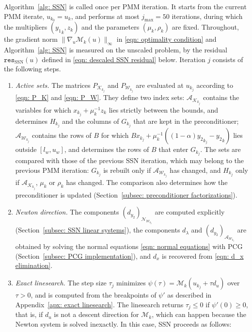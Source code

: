 Algorithm~\ref{alg: SSN} is called once per PMM iteration. It starts from the current PMM iterate, $u_{k_0} = u_k$, and performs at most $j_{\max} = 50$ iterations, during which the multipliers $({y_1}_k,z_k)$ and the parameters $(\mu_k,\rho_k)$ are fixed. Throughout, the gradient norm $\|\nabla_u \mathcal{M}_k(u)\|_\infty$ in \eqref{eqn: optimality condition} and Algorithm~\ref{alg: SSN} is measured on the unscaled problem, by the residual $\texttt{res}_{\mathrm{SSN}}(u)$ defined in \eqref{eqn: descaled SSN residual} below. Iteration $j$ consists of the following steps.
\begin{enumerate}
    \item \emph{Active sets.} The matrices $P_{\mathcal{K}_{k_j}}$ and $P_{\mathcal{W}_{k_j}}$ are evaluated at $u_{k_j}$ according to \eqref{eqn: P_K} and \eqref{eqn: P_W}. They define two index sets: $\mathcal{A}_{\mathcal{K}_{k_j}}$ contains the variables for which $x_{k_j} + \mu_k^{-1} z_k$ lies strictly between the bounds, and determines $H_{k_j}$ and the columns of $G_{k_j}$ that are kept in the preconditioner; $\mathcal{A}_{\mathcal{W}_{k_j}}$ contains the rows of $B$ for which $Bx_{k_j} + \mu_k^{-1}((1-\alpha){y_2}_{k_j} - {y_2}_k)$ lies outside $[l_w,u_w]$, and determines the rows of $B$ that enter $G_{k_j}$. The sets are compared with those of the previous SSN iteration, which may belong to the previous PMM iteration: $G_{k_j}$ is rebuilt only if $\mathcal{A}_{\mathcal{W}_{k_j}}$ has changed, and $H_{k_j}$ only if $\mathcal{A}_{\mathcal{K}_{k_j}}$, $\mu_k$ or $\rho_k$ has changed. The comparison also determines how the preconditioner is updated (Section~\ref{subsec: preconditioner factorizations}).
    \item \emph{Newton direction.} The components $(d_{y_2})_{\mathcal{N}_{\mathcal{W}_{k_j}}}$ are computed explicitly (Section~\ref{subsec: SSN linear systems}), the components $d_\lambda$ and $(d_{y_2})_{\mathcal{A}_{\mathcal{W}_{k_j}}}$ are obtained by solving the normal equations \eqref{eqn: normal equations} with PCG (Section~\ref{subsec: PCG implementation}), and $d_x$ is recovered from \eqref{eqn: d_x elimination}.
    \item \emph{Exact linesearch.} The step size $\tau_j$ minimizes $\psi(\tau) = \mathcal{M}_k(u_{k_j} + \tau d_u)$ over $\tau > 0$, and is computed from the breakpoints of $\psi'$ as described in Appendix~\ref{apx: exact linesearch}. The linesearch returns $\tau_j \le 0$ if $\psi'(0) \ge 0$, that is, if $d_u$ is not a descent direction for $\mathcal{M}_k$, which can happen because the Newton system is solved inexactly. In this case, SSN proceeds as follows:

\end{enumerate}
